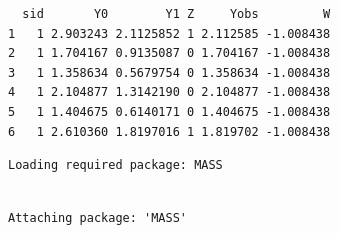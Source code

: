 \documentclass[
  letterpaper,
  DIV=11,
  numbers=noendperiod]{scrreprt}
\newenvironment{Shaded}{\begin{snugshade}}{\end{snugshade}}
\newcommand{\AttributeTok}[1]{\textcolor[rgb]{0.49,0.56,0.16}{#1}}
\newcommand{\DecValTok}[1]{\textcolor[rgb]{0.25,0.63,0.44}{#1}}
\newcommand{\FunctionTok}[1]{\textcolor[rgb]{0.02,0.16,0.49}{#1}}
\newcommand{\NormalTok}[1]{\textcolor[rgb]{0.00,0.44,0.13}{#1}}
\newcommand{\OtherTok}[1]{\textcolor[rgb]{0.00,0.44,0.13}{#1}}
\newcommand{\SpecialCharTok}[1]{\textcolor[rgb]{0.25,0.44,0.63}{#1}}
\begin{document}
\begin{verbatim}
  sid       Y0        Y1 Z     Yobs         W
1   1 2.903243 2.1125852 1 2.112585 -1.008438
2   1 1.704167 0.9135087 0 1.704167 -1.008438
3   1 1.358634 0.5679754 0 1.358634 -1.008438
4   1 2.104877 1.3142190 0 2.104877 -1.008438
5   1 1.404675 0.6140171 0 1.404675 -1.008438
6   1 2.610360 1.8197016 1 1.819702 -1.008438
\end{verbatim}

\begin{Shaded}
\end{Shaded}

\begin{verbatim}
Loading required package: MASS
\end{verbatim}

\begin{verbatim}

Attaching package: 'MASS'
\end{verbatim}
\end{document}
